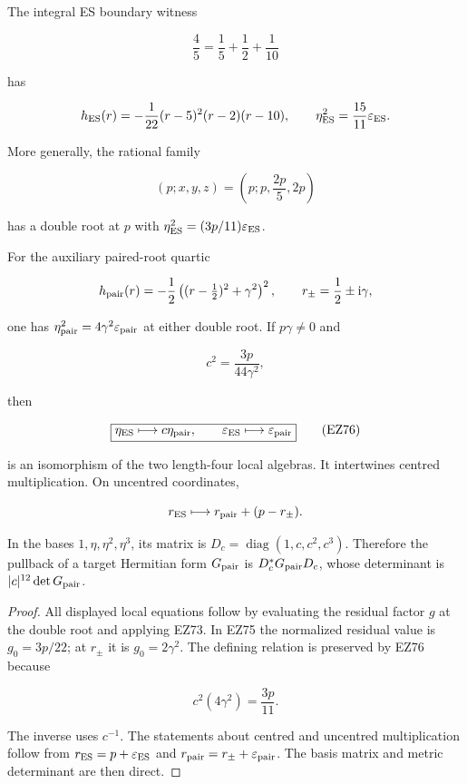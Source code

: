 \begin{theorem}
\label{thm:local-es-rh-map}
The integral ES boundary witness

\[
 \frac45=\frac15+\frac12+\frac1{10}
\]

has

\[
 h_{\rm ES}(r)=-\frac1{22}(r-5)^2(r-2)(r-10),\qquad
 \eta_{\rm ES}^2=\frac{15}{11}\varepsilon_{\rm ES}.
\]

More generally, the rational family

\begin{equation}
 (p;x,y,z)=\left(p;p,\frac{2p}{5},2p\right)           \tag{EZ75}
\end{equation}

has a double root at \(p\) with
\(\eta_{\rm ES}^2=(3p/11)\varepsilon_{\rm ES}\).

For the auxiliary paired-root quartic

\[
 h_{\rm pair}(r)=-\frac12\left((r-\tfrac12)^2+\gamma^2\right)^2,
 \qquad r_\pm=\frac12\pm\mathrm i\gamma,
\]

one has \(\eta_{\rm pair}^2=4\gamma^2\varepsilon_{\rm pair}\) at either
double root.  If \(p\gamma\ne0\) and

\[
 c^2=\frac{3p}{44\gamma^2},
\]

then

\begin{equation}
 \boxed{
 \eta_{\rm ES}\longmapsto c\eta_{\rm pair},\qquad
 \varepsilon_{\rm ES}\longmapsto\varepsilon_{\rm pair}}       \tag{EZ76}
\end{equation}

is an isomorphism of the two length-four local algebras.  It intertwines
centred multiplication.  On uncentred coordinates,

\[
 r_{\rm ES}\longmapsto r_{\rm pair}+(p-r_\pm).
\]

In the bases \(1,\eta,\eta^2,\eta^3\), its matrix is
\(D_c=\operatorname{diag}(1,c,c^2,c^3)\).  Therefore the pullback of a target
Hermitian form \(G_{\rm pair}\) is \(D_c^*G_{\rm pair}D_c\), whose determinant
is \(|c|^{12}\det G_{\rm pair}\).
\end{theorem}

\begin{proof}
All displayed local equations follow by evaluating the residual factor \(g\)
at the double root and applying EZ73.  In EZ75 the normalized residual value
is \(g_0=3p/22\); at \(r_\pm\) it is \(g_0=2\gamma^2\).  The defining relation
is preserved by EZ76 because

\[
 c^2(4\gamma^2)=\frac{3p}{11}.
\]

The inverse uses \(c^{-1}\).  The statements about centred and uncentred
multiplication follow from
\(r_{\rm ES}=p+\varepsilon_{\rm ES}\) and
\(r_{\rm pair}=r_\pm+\varepsilon_{\rm pair}\).  The basis matrix and metric
determinant are then direct.
\end{proof}

